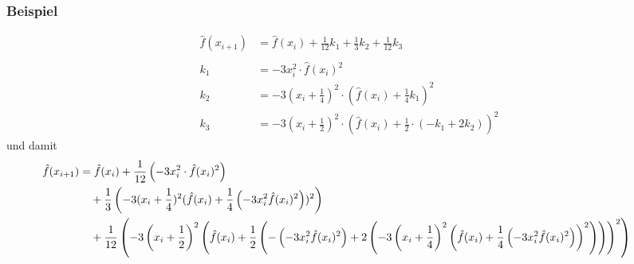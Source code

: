 \begin{frame}\frametitle{Beispiel}
\begin{align*}
\hat f(x_{i+1})&=\hat f(x_i)+\frac{1}{12}k_1+\frac{1}{3}k_2+\frac{1}{12}k_3\\
&\\
k_1&=-3x_i^2\cdot \hat f(x_i)^2\\
k_2&=-3(x_i+\frac{1}{4})^2\cdot (\hat f(x_i)+\frac{1}{4}k_1)^2\\
k_3&=-3(x_i+\frac{1}{2})^2\cdot (\hat f(x_i)+\frac{1}{2}\cdot (-k_1+2k_2))^2
\end{align*}\pause
und damit
\tiny
\begin{align*}
\hspace{-8mm}\hat f(x_{i+1})&=\hat f(x_i)+\frac{1}{12}\left(-3x_i^2\cdot \hat f(x_i)^2\right)\\
&\quad +\frac{1}{3}\left(-3(x_i+\frac{1}{4})^2 (\hat f(x_i)+\frac{1}{4}\left(-3x_i^2 \hat f(x_i)^2\right))^2\right)\\
&\quad +\frac{1}{12}\left(-3\left(x_i+\frac{1}{2}\right)^2 \left(\hat f(x_i)+\frac{1}{2} \left(-\left(-3x_i^2 \hat f(x_i)^2\right)+2\left(-3\left(x_i+\frac{1}{4}\right)^2\left( \hat f(x_i)+\frac{1}{4}\left(-3x_i^2 \hat f(x_i)^2\right)\right)^2\right)\right)\right)^2\right)
\end{align*}
\end{frame}
%

